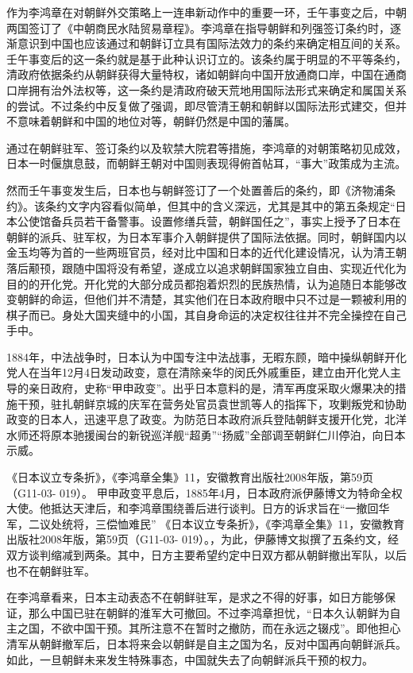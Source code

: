 \documentclass[12pt,UTF8]{ctexbook}
\begin{document}
作为李鸿章在对朝鲜外交策略上一连串新动作中的重要一环，壬午事变之后，中朝两国签订了《中朝商民水陆贸易章程》。李鸿章在指导朝鲜和列强签订条约时，逐渐意识到中国也应该通过和朝鲜订立具有国际法效力的条约来确定相互间的关系。壬午事变后的这一条约就是基于此种认识订立的。该条约属于明显的不平等条约，清政府依据条约从朝鲜获得大量特权，诸如朝鲜向中国开放通商口岸，中国在通商口岸拥有治外法权等，这一条约是清政府破天荒地用国际法形式来确定和属国关系的尝试。不过条约中反复做了强调，即尽管清王朝和朝鲜以国际法形式建交，但并不意味着朝鲜和中国的地位对等，朝鲜仍然是中国的藩属。

通过在朝鲜驻军、签订条约以及软禁大院君等措施，李鸿章的对朝策略初见成效，日本一时偃旗息鼓，而朝鲜王朝对中国则表现得俯首帖耳，“事大”政策成为主流。

然而壬午事变发生后，日本也与朝鲜签订了一个处置善后的条约，即《济物浦条约》。该条约文字内容看似简单，但其中的含义深远，尤其是其中的第五条规定“日本公使馆备兵员若干备警事。设置修缮兵营，朝鲜国任之”，事实上授予了日本在朝鲜的派兵、驻军权，为日本军事介入朝鲜提供了国际法依据。同时，朝鲜国内以金玉均等为首的一些两班官员，经对比中国和日本的近代化建设情况，认为清王朝落后颟顸，跟随中国将没有希望，遂成立以追求朝鲜国家独立自由、实现近代化为目的的开化党。开化党的大部分成员都抱着炽烈的民族热情，认为追随日本能够改变朝鲜的命运，但他们并不清楚，其实他们在日本政府眼中只不过是一颗被利用的棋子而已。身处大国夹缝中的小国，其自身命运的决定权往往并不完全操控在自己手中。

1884年，中法战争时，日本认为中国专注中法战事，无暇东顾，暗中操纵朝鲜开化党人在当年12月4日发动政变，意在清除亲华的闵氏外戚重臣，建立由开化党人主导的亲日政府，史称“甲申政变”。出乎日本意料的是，清军再度采取火爆果决的措施干预，驻扎朝鲜京城的庆军在营务处官员袁世凯等人的指挥下，攻剿叛党和协助政变的日本人，迅速平息了政变。为防范日本政府派兵登陆朝鲜支援开化党，北洋水师还将原本驰援闽台的新锐巡洋舰“超勇”“扬威”全部调至朝鲜仁川停泊，向日本示威。

《日本议立专条折》，《李鸿章全集》11，安徽教育出版社2008年版，第59页（G11-03- 019）。
甲申政变平息后，1885年4月，日本政府派伊藤博文为特命全权大使。他抵达天津后，和李鸿章围绕善后进行谈判。日方的诉求旨在“一撤回华军，二议处统将，三偿恤难民” 《日本议立专条折》，《李鸿章全集》11，安徽教育出版社2008年版，第59页（G11-03- 019）。，为此，伊藤博文拟撰了五条约文，经双方谈判缩减到两条。其中，日方主要希望约定中日双方都从朝鲜撤出军队，以后也不在朝鲜驻军。

在李鸿章看来，日本主动表态不在朝鲜驻军，是求之不得的好事，如日方能够保证，那么中国已驻在朝鲜的淮军大可撤回。不过李鸿章担忧，“日本久认朝鲜为自主之国，不欲中国干预。其所注意不在暂时之撤防，而在永远之辍戍”。即他担心清军从朝鲜撤军后，日本将来会以朝鲜是自主之国为名，反对中国再向朝鲜派兵。如此，一旦朝鲜未来发生特殊事态，中国就失去了向朝鲜派兵干预的权力。
\end{document}
